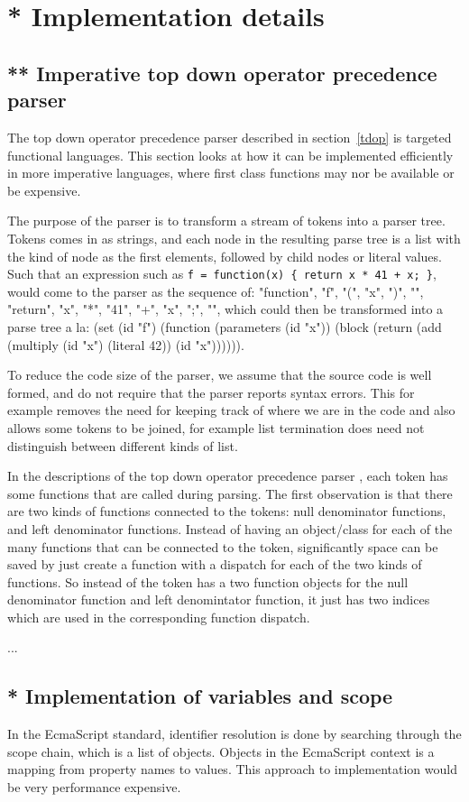 \section{* Implementation details}
\subsection{** Imperative top down operator precedence parser}
The top down operator precedence parser described in section~\ref{tdop} is targeted functional languages.
This section looks at how it can be implemented efficiently in more imperative languages, where first class functions may nor be available or be expensive.

The purpose of the parser is to transform a stream of tokens into a parser tree.
Tokens comes in as strings, and each node in the resulting parse tree is a list with the kind of node as the first elements, followed by child nodes or literal values.
Such that an expression such as \verb~f = function(x) { return x * 41 + x; }~, would come to the parser as the sequence of: 
"function", "f", "(", "x", ")", "{", "return", "x", "*", "41", "+", "x", ";", "}",
which could
then be transformed into a parse tree a la: (set (id "f") (function (parameters (id "x")) (block (return (add (multiply (id "x") (literal 42)) (id "x")))))).


To reduce the code size of the parser, we assume that the source code is well formed, and do not require that the parser reports syntax errors. This for example removes the need for keeping track of where we are in the code and also allows some tokens to be joined, for example list termination does need not distinguish between different kinds of list.

In the descriptions of the top down operator precedence parser \cite{tdop,beautifulcode}, each token has some functions that are called during parsing. 
The first observation is that there are two kinds of functions connected to the tokens: null denominator functions, and left denominator functions. 
Instead of having an object/class for each of the many functions that can be connected to the token, significantly space can be saved by just create a function with a dispatch for each of the two kinds of functions.
So instead of the token has a two function objects for the null denominator function and left denomintator function, it just has two indices which are used in the corresponding function dispatch.

...


\subsection{* Implementation of variables and scope}
In the EcmaScript standard, identifier resolution is done by searching through the scope chain, which is a list of objects. Objects in the EcmaScript context is a mapping from property names to values. This approach to implementation would be very performance expensive.

